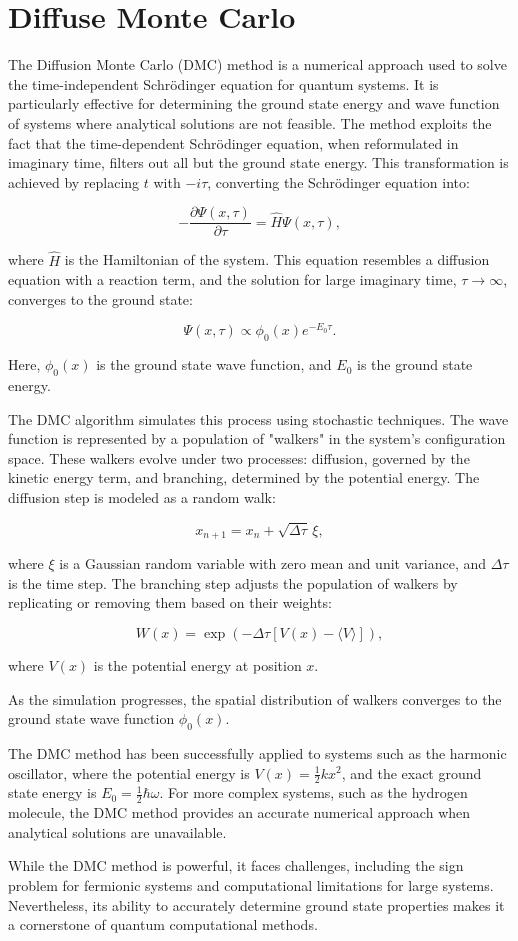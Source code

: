 \section{Diffuse Monte Carlo}

The Diffusion Monte Carlo (DMC) method is a numerical approach used to solve the time-independent Schrödinger equation for quantum systems. It is particularly effective for determining the ground state energy and wave function of systems where analytical solutions are not feasible. The method exploits the fact that the time-dependent Schrödinger equation, when reformulated in imaginary time, filters out all but the ground state energy. This transformation is achieved by replacing \( t \) with \( -i\tau \), converting the Schrödinger equation into:

\[
-\frac{\partial \Psi(x, \tau)}{\partial \tau} = \hat{H} \Psi(x, \tau),
\]

where \( \hat{H} \) is the Hamiltonian of the system. This equation resembles a diffusion equation with a reaction term, and the solution for large imaginary time, \( \tau \to \infty \), converges to the ground state:

\[
\Psi(x, \tau) \propto \phi_0(x) e^{-E_0 \tau}.
\]

Here, \( \phi_0(x) \) is the ground state wave function, and \( E_0 \) is the ground state energy.

The DMC algorithm simulates this process using stochastic techniques. The wave function is represented by a population of "walkers" in the system's configuration space. These walkers evolve under two processes: diffusion, governed by the kinetic energy term, and branching, determined by the potential energy. The diffusion step is modeled as a random walk:

\[
x_{n+1} = x_n + \sqrt{\Delta \tau} \, \xi,
\]

where \( \xi \) is a Gaussian random variable with zero mean and unit variance, and \( \Delta \tau \) is the time step. The branching step adjusts the population of walkers by replicating or removing them based on their weights:

\[
W(x) = \exp\left(-\Delta \tau \left[V(x) - \langle V \rangle\right]\right),
\]

where \( V(x) \) is the potential energy at position \( x \).

As the simulation progresses, the spatial distribution of walkers converges to the ground state wave function \( \phi_0(x) \).

The DMC method has been successfully applied to systems such as the harmonic oscillator, where the potential energy is \( V(x) = \frac{1}{2}kx^2 \), and the exact ground state energy is \( E_0 = \frac{1}{2}\hbar\omega \). For more complex systems, such as the hydrogen molecule, the DMC method provides an accurate numerical approach when analytical solutions are unavailable.

While the DMC method is powerful, it faces challenges, including the sign problem for fermionic systems and computational limitations for large systems. Nevertheless, its ability to accurately determine ground state properties makes it a cornerstone of quantum computational methods.
